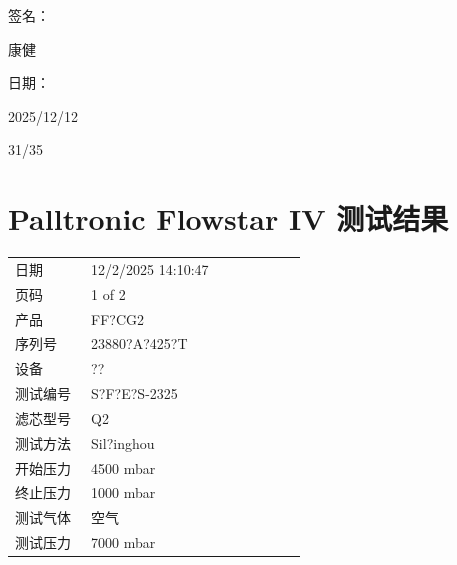 \documentclass[UTF8,10pt,a4paper,fontset=fandol]{ctexart}
\newcommand{\fieldvalue}[1]{#1}
\newcommand{\handwritten}[1]{#1}
\begin{document}
签名：

\fieldvalue{\handwritten{康健}}

日期：

\fieldvalue{\handwritten{2025/12/12}}

\handwritten{31/35}

\newpage

\section*{Palltronic Flowstar IV 测试结果}

\begin{tabular}{@{}p{0.24\linewidth}p{0.68\linewidth}@{}}
日期 &
\fieldvalue{12/2/2025 14:10:47}
\\
页码 &
\fieldvalue{1 of 2}
\\
产品 &
\fieldvalue{FF?CG2}
\\
序列号 &
\fieldvalue{23880?A?425?T}
\\
设备 &
\fieldvalue{??}
\\
测试编号 &
\fieldvalue{S?F?E?S-2325}
\\
滤芯型号 &
\fieldvalue{Q2}
\\
测试方法 &
\fieldvalue{Sil?inghou}
\\
开始压力 &
\fieldvalue{4500 mbar}
\\
终止压力 &
\fieldvalue{1000 mbar}
\\
测试气体 &
\fieldvalue{空气}
\\
测试压力 &
\fieldvalue{7000 mbar}
\end{tabular}
\end{document}
